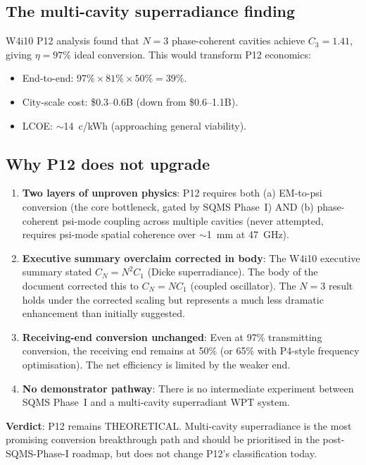 \documentclass[11pt]{article}
\begin{document}
\subsection{The multi-cavity superradiance finding}

W4i10 P12 analysis found that $N = 3$ phase-coherent cavities achieve
$C_3 = 1.41$, giving $\eta = 97\%$ ideal conversion. This would transform
P12 economics:
\begin{itemize}[nosep]
  \item End-to-end: $97\% \times 81\% \times 50\% = 39\%$.
  \item City-scale cost: \$0.3--0.6B (down from \$0.6--1.1B).
  \item LCOE: $\sim$14~c/kWh (approaching general viability).
\end{itemize}

\subsection{Why P12 does not upgrade}

\begin{enumerate}
\item \textbf{Two layers of unproven physics}: P12 requires both
  (a) EM-to-psi conversion (the core bottleneck, gated by SQMS Phase~I)
  AND (b) phase-coherent psi-mode coupling across multiple cavities
  (never attempted, requires psi-mode spatial coherence over $\sim$1~mm
  at 47~GHz).

\item \textbf{Executive summary overclaim corrected in body}: The W4i10
  executive summary stated $C_N = N^2 C_1$ (Dicke superradiance). The
  body of the document corrected this to $C_N = NC_1$ (coupled oscillator).
  The $N = 3$ result holds under the corrected scaling but represents a
  much less dramatic enhancement than initially suggested.

\item \textbf{Receiving-end conversion unchanged}: Even at 97\% transmitting
  conversion, the receiving end remains at 50\% (or 65\% with P4-style
  frequency optimisation). The net efficiency is limited by the weaker end.

\item \textbf{No demonstrator pathway}: There is no intermediate experiment
  between SQMS Phase~I and a multi-cavity superradiant WPT system.
\end{enumerate}

\textbf{Verdict}: P12 remains THEORETICAL. Multi-cavity superradiance is
the most promising conversion breakthrough path and should be prioritised
in the post-SQMS-Phase-I roadmap, but does not change P12's classification
today.
\end{document}
